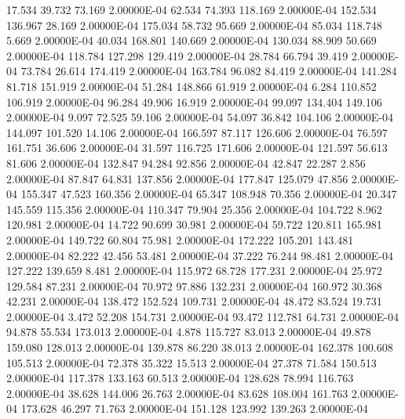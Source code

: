     17.534    39.732    73.169  2.00000E-04
    62.534    74.393   118.169  2.00000E-04
   152.534   136.967    28.169  2.00000E-04
   175.034    58.732    95.669  2.00000E-04
    85.034   118.748     5.669  2.00000E-04
    40.034   168.801   140.669  2.00000E-04
   130.034    88.909    50.669  2.00000E-04
   118.784   127.298   129.419  2.00000E-04
    28.784    66.794    39.419  2.00000E-04
    73.784    26.614   174.419  2.00000E-04
   163.784    96.082    84.419  2.00000E-04
   141.284    81.718   151.919  2.00000E-04
    51.284   148.866    61.919  2.00000E-04
     6.284   110.852   106.919  2.00000E-04
    96.284    49.906    16.919  2.00000E-04
    99.097   134.404   149.106  2.00000E-04
     9.097    72.525    59.106  2.00000E-04
    54.097    36.842   104.106  2.00000E-04
   144.097   101.520    14.106  2.00000E-04
   166.597    87.117   126.606  2.00000E-04
    76.597   161.751    36.606  2.00000E-04
    31.597   116.725   171.606  2.00000E-04
   121.597    56.613    81.606  2.00000E-04
   132.847    94.284    92.856  2.00000E-04
    42.847    22.287     2.856  2.00000E-04
    87.847    64.831   137.856  2.00000E-04
   177.847   125.079    47.856  2.00000E-04
   155.347    47.523   160.356  2.00000E-04
    65.347   108.948    70.356  2.00000E-04
    20.347   145.559   115.356  2.00000E-04
   110.347    79.904    25.356  2.00000E-04
   104.722     8.962   120.981  2.00000E-04
    14.722    90.699    30.981  2.00000E-04
    59.722   120.811   165.981  2.00000E-04
   149.722    60.804    75.981  2.00000E-04
   172.222   105.201   143.481  2.00000E-04
    82.222    42.456    53.481  2.00000E-04
    37.222    76.244    98.481  2.00000E-04
   127.222   139.659     8.481  2.00000E-04
   115.972    68.728   177.231  2.00000E-04
    25.972   129.584    87.231  2.00000E-04
    70.972    97.886   132.231  2.00000E-04
   160.972    30.368    42.231  2.00000E-04
   138.472   152.524   109.731  2.00000E-04
    48.472    83.524    19.731  2.00000E-04
     3.472    52.208   154.731  2.00000E-04
    93.472   112.781    64.731  2.00000E-04
    94.878    55.534   173.013  2.00000E-04
     4.878   115.727    83.013  2.00000E-04
    49.878   159.080   128.013  2.00000E-04
   139.878    86.220    38.013  2.00000E-04
   162.378   100.608   105.513  2.00000E-04
    72.378    35.322    15.513  2.00000E-04
    27.378    71.584   150.513  2.00000E-04
   117.378   133.163    60.513  2.00000E-04
   128.628    78.994   116.763  2.00000E-04
    38.628   144.006    26.763  2.00000E-04
    83.628   108.004   161.763  2.00000E-04
   173.628    46.297    71.763  2.00000E-04
   151.128   123.992   139.263  2.00000E-04
